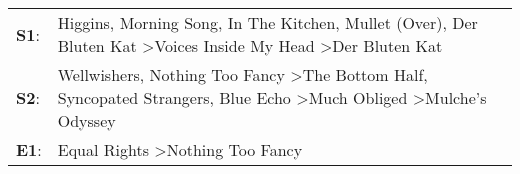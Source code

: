 \begin{supertabular}{p{0.03\textwidth}p{0.92\textwidth}}
 \textbf{S1}:  &                   Higgins\textsuperscript{}, \enspace Morning Song\textsuperscript{}, \enspace In The Kitchen\textsuperscript{}, \enspace Mullet (Over)\textsuperscript{}, \enspace Der Bluten Kat\textsuperscript{} \textgreater \enspace Voices Inside My Head\textsuperscript{} \textgreater \enspace Der Bluten Kat\textsuperscript{}  \enspace  \\
 \textbf{S2}:  &  Wellwishers\textsuperscript{}, \enspace Nothing Too Fancy\textsuperscript{} \textgreater \enspace The Bottom Half\textsuperscript{}, \enspace Syncopated Strangers\textsuperscript{}, \enspace Blue Echo\textsuperscript{} \textgreater \enspace Much Obliged\textsuperscript{} \textgreater \enspace Mulche's Odyssey\textsuperscript{}  \enspace  \\
 \textbf{E1}:  &                                                                                                                                                                                                                                                  Equal Rights\textsuperscript{} \textgreater \enspace Nothing Too Fancy\textsuperscript{}  \enspace  \\
\end{supertabular}
